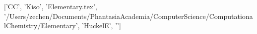 ['CC', 'Kiso', 'Elementary.tex', '/Users/zechen/Documents/PhantasiaAcademia/ComputerScience/ComputationalChemistry/Elementary', 'HuckelE', '\xad{}\xbb{}\xad{}']
